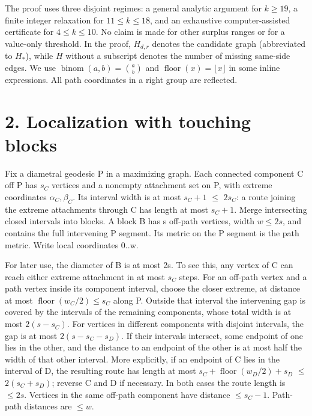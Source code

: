\documentclass[
  11pt,
]{article}
\begin{document}
The proof uses three disjoint regimes: a general analytic argument for
\(k\ge19\), a finite integer relaxation for \(11\le k\le18\), and an
exhaustive computer-assisted certificate for \(4\le k\le10\). No claim
is made for other surplus ranges or for a value-only threshold. In the
proof, \(H_{d,r}\) denotes the candidate graph (abbreviated to \(H_*\)),
while \(H\) without a subscript denotes the number of missing same-side
edges. We use \(\operatorname{binom}(a,b)=\binom{a}{b}\) and
\(\operatorname{floor}(x)=\lfloor x\rfloor\) in some inline expressions.
All path coordinates in a right group are reflected.

\section{2. Localization with touching
blocks}\label{localization-with-touching-blocks}

Fix a diametral geodesic P in a maximizing graph. Each connected
component C off P has \(s_{C}\) vertices and a nonempty attachment set
on P, with extreme coordinates \(\alpha _{C},\beta _{C}\). Its interval
width is at most \(s_{C}+1\) \(\le\) \(2s_{C}\): a route joining the
extreme attachments through C has length at most \(s_{C}+1\). Merge
intersecting closed intervals into blocks. A block B has s off-path
vertices, width \(w\le 2s\), and contains the full intervening P
segment. Its metric on the P segment is the path metric. Write local
coordinates 0..w.

For later use, the diameter of B is at most 2s. To see this, any vertex
of C can reach either extreme attachment in at most \(s_{C}\) steps. For
an off-path vertex and a path vertex inside its component interval,
choose the closer extreme, at distance at most
\(\operatorname{floor}(w_{C}/2)\le s_{C}\) along P. Outside that
interval the intervening gap is covered by the intervals of the
remaining components, whose total width is at most \(2(s-s_{C})\). For
vertices in different components with disjoint intervals, the gap is at
most \(2(s-s_{C}-s_{D})\). If their intervals intersect, some endpoint
of one lies in the other, and the distance to an endpoint of the other
is at most half the width of that other interval. More explicitly, if an
endpoint of C lies in the interval of D, the resulting route has length
at most \(s_{C}+\operatorname{floor}(w_{D}/2)+s_{D}\) \(\le\)
\(2(s_{C}+s_{D})\); reverse C and D if necessary. In both cases the
route length is \(\le 2s\). Vertices in the same off-path component have
distance \(\le s_{C}-1\). Path-path distances are \(\le w\).
\end{document}
